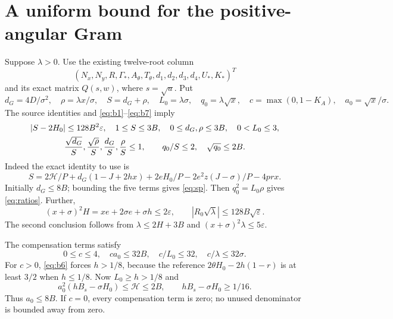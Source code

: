 \documentclass[10pt]{article}
\newcommand{\eps}{\varepsilon}
\begin{document}
\section{A uniform bound for the positive-angular Gram}

Suppose $\lambda>0$. Use the existing twelve-root column
\[
 (N_x,N_y,R,\Gamma_*,A_\theta,T_\theta,d_1,d_2,d_3,d_4,U_*,K_*)^T
\]
and its exact matrix $Q(s,w)$, where $s=\sqrt u$. Put
\[
 d_G=4D/\sigma^2,\quad\rho=\lambda x/\sigma,\quad S=d_G+\rho,
 \quad L_0=\lambda\sigma,\quad q_0=\lambda\sqrt x,
 \quad c=\max(0,1-K_A),\quad a_0=\sqrt x/\sigma.
\]
The source identities and \eqref{eq:b1}--\eqref{eq:b7} imply
\begin{gather}
 |S-2H_0|\le128B^2\eps,\quad1\le S\le3B,
 \quad0\le d_G,\rho\le3B,\quad0<L_0\le3,\label{eq:sp}\\
 {\sqrt{d_G}\over S},{\sqrt\rho\over S},{d_G\over S},
 {\rho\over S}\le1,\qquad q_0/S\le2,\quad\sqrt{q_0}\le2B.
                                                        \label{eq:ratios}
\end{gather}
Indeed the exact identity to use is
\[
 S=2\mathcal H/P+d_G(1-J+2hx)+2eH_0/P
                     -2e^2z(J-\sigma)/P-4prx.
\]
Initially $d_G\le8B$; bounding the five terms gives
\eqref{eq:sp}. Then $q_0^2=L_0\rho$ gives \eqref{eq:ratios}.
Further,
\[
 (x+\sigma)^2H=xe+2\sigma e+\sigma h\le2\eps,
 \qquad |R_0\sqrt\lambda|\le128B\sqrt\eps.
\]
The second conclusion follows from $\lambda\le2H+3B$ and
$(x+\sigma)^2\lambda\le5\eps$.

The compensation terms satisfy
\begin{equation}
 0\le c\le4,\quad ca_0\le32B,\quad c/L_0\le32,
                         \quad c/\lambda\le32\sigma.\label{eq:c}
\end{equation}
For $c>0$, \eqref{eq:b6} forces $h>1/8$, because the reference
$2\theta H_0-2h(1-r)$ is at least $3/2$ when $h\le1/8$.
Now $L_0\ge h>1/8$ and
\[
 a_0^2(hB_s-\sigma H_0)\le\mathcal H\le2B,
 \qquad hB_s-\sigma H_0\ge1/16.
\]
Thus $a_0\le8B$. If $c=0$, every compensation term is zero;
no unused denominator is bounded away from zero.
\end{document}
